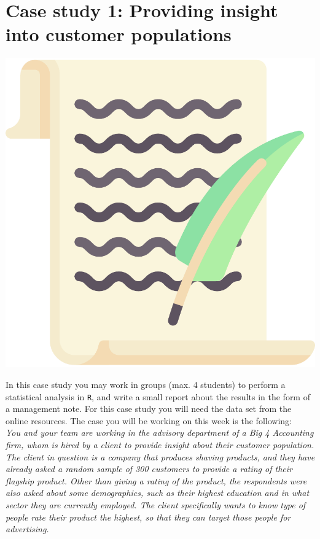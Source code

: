 
\begin{minipage}{0.8\textwidth}
\section{Case study 1: Providing insight into customer populations}
\end{minipage}%
\hfill%
\begin{minipage}{0.1\textwidth}
\includegraphics[width=\linewidth]{Files/Images/lettericon.pdf}
\end{minipage}
\vspace*{.1cm}

In this case study you may work in groups (max. 4 students) to perform a statistical analysis in \texttt{R}, and write a small report about the results in the form of a management note. For this case study you will need the data set  from the online resources. The case you will be working on this week is the following: \\

\textit{You and your team are working in the advisory department of a Big 4 Accounting firm, whom is hired by a client to provide insight about their customer population. The client in question is a company that produces shaving products, and they have already asked a random sample of 300 customers to provide a rating of their flagship product. Other than giving a rating of the product, the respondents were also asked about some demographics, such as their highest education and in what sector they are currently employed. The client specifically wants to know type of people rate their product the highest, so that they can target those people for advertising.} \\

